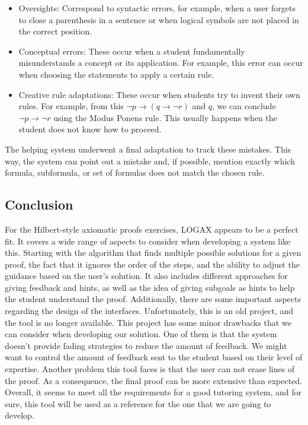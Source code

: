 \begin{itemize}
    \item Oversights: Correspond to syntactic errors, for example, when a user forgets to close a parenthesis in a sentence or when logical symbols are not placed in the correct position.
    \item Conceptual errors: These occur when a student fundamentally misunderstands a concept or its application. For example, this error can occur when choosing the statements to apply a certain rule.
    \item Creative rule adaptations: These occur when students try to invent their own rules. For example, from this \( \neg p \to (q \to \neg r) \) and \( q \), we can conclude \( \neg p \to \neg r \) using the Modus Ponens rule. This usually happens when the student does not know how to proceed.
\end{itemize}

The helping system underwent a final adaptation to track these mistakes. This way, the system can point out a mistake and, if possible, mention exactly which formula, subformula, or set of formulas does not match the chosen rule.

\subsection{Conclusion}

For the Hilbert-style axiomatic proofs exercises, LOGAX appears to be a perfect fit. It covers a wide range of aspects to consider when developing a system like this. Starting with the algorithm that finds multiple possible solutions for a given proof, the fact that it ignores the order of the steps, and the ability to adjust the guidance based on the user's solution. It also includes different approaches for giving feedback and hints, as well as the idea of giving subgoals as hints to help the student understand the proof. Additionally, there are some important aspects regarding the design of the interfaces. Unfortunately, this is an old project, and the tool is no longer available. This project has some minor drawbacks that we can consider when developing our solution. One of them is that the system doesn't provide fading strategies to reduce the amount of feedback. We might want to control the amount of feedback sent to the student based on their level of expertise. Another problem this tool faces is that the user can not erase lines of the proof. As a consequence, the final proof can be more extensive than expected. Overall, it seems to meet all the requirements for a good tutoring system, and for sure, this tool will be used as a reference for the one that we are going to develop.

